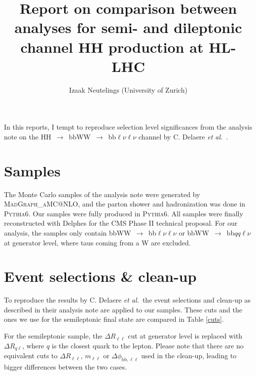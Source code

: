 \documentclass[10pt,a4paper]{article}
\title{Report on comparison between analyses for semi- and dileptonic channel HH production at HL-LHC}
\author{Izaak Neutelings (University of Zurich)}
\newcommand{\di}{$\rightarrow$ bbWW $\rightarrow$ bb$\ell\nu \ell\nu$}
\newcommand{\lnu}{$\ell\nu$}
\renewcommand{\ll}{\ell\ell}
\newcommand{\etal}{\emph{et al.}}
\begin{document}
\maketitle



In this reports, I tempt to reproduce selection level significances from the analysis note on the \mbox{HH \di} channel by C. Delaere \etal\ \cite{AN}. %





\section{Samples}

The Monte Carlo samples of the analysis note were generated by \textsc{MadGraph\_aMC@NLO}, and the parton shower and hadronization was done in \textsc{Pythia6}. Our samples were fully produced in \textsc{Pythia6}. All samples were finally reconstructed with Delphes for the CMS Phase II technical proposal.
For our analysis, the samples only contain \mbox{bbWW $\rightarrow$ bb\lnu\lnu} or \mbox{bbWW $\rightarrow$ bb$qq$\lnu} at generator level, where taus coming from a W are excluded. %





\section{Event selections \& clean-up}

To reproduce the results by C. Delaere \etal\, the event selections and clean-up as described in their analysis note are applied to our samples. %
These cuts and the ones we use for the semileptonic final state are compared in Table \ref{cuts}.

For the semileptonic sample, the $\Delta R_{\ll}$ cut at generator level is replaced with $\Delta R_{q\ell}$, where $q$ is the closest quark to the lepton. Please note that there are no equivalent cuts to $\Delta R_{\ll}$, $m_{\ll}$ or $\Delta \phi_{\text{bb},\ll}$ used in the clean-up, leading to bigger differences between the two cases.
\end{document}
